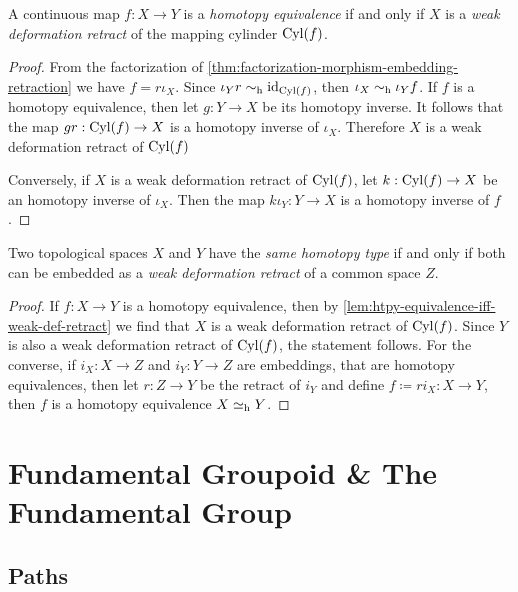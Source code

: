\begin{lemma}
    \label{lem:htpy-equivalence-iff-weak-def-retract}
    A continuous map \(f: X \to Y\) is a \emph{homotopy equivalence} if and only if
    \(X\) is a \emph{weak deformation retract} of the mapping cylinder \(\operatorname{Cyl}(f)\).
\end{lemma}

\begin{proof}
    From the factorization of \cref{thm:factorization-morphism-embedding-retraction}
    we have \(f = r \iota_X\). Since \(\iota_Y r \sim_{\text{h}} \operatorname{id}_{\operatorname{Cyl}(f)}\), then
    \(\iota_X \sim_{\text{h}} \iota_Y f\). If \(f\) is a homotopy equivalence, then let
    \(g: Y \to X\) be its homotopy inverse. It follows that the map
    \(g r: \operatorname{Cyl}(f) \to X\) is a homotopy inverse of \(\iota_X\). Therefore \(X\) is
    a weak deformation retract of \(\operatorname{Cyl}(f)\)

    Conversely, if \(X\) is a weak deformation retract of \(\operatorname{Cyl}(f)\), let
    \(k: \operatorname{Cyl}(f) \to X\) be an homotopy inverse of \(\iota_X\). Then the map \(k
    \iota_Y: Y \to X\) is a homotopy inverse of \(f\).
\end{proof}

\begin{theorem}
    \label{thm:same-htpy-type-iff-emb-weak-deformation-retract}
    Two topological spaces \(X\) and \(Y\) have the \emph{same homotopy type} if and
    only if both can be embedded as a \emph{weak deformation retract} of a common
    space \(Z\).
\end{theorem}

\begin{proof}
    If \(f: X \to Y\) is a homotopy equivalence, then by
    \cref{lem:htpy-equivalence-iff-weak-def-retract} we find that \(X\) is a weak
    deformation retract of \(\operatorname{Cyl}(f)\). Since \(Y\) is also a weak deformation
    retract of \(\operatorname{Cyl}(f)\), the statement follows. For the converse, if \(i_X: X \to
    Z\) and \(i_Y: Y \to Z\) are embeddings, that are homotopy equivalences, then
    let \(r: Z \to Y\) be the retract of \(i_Y\) and define \(f \coloneq r i_X: X
    \to Y\), then \(f\) is a homotopy equivalence \(X \simeq_{\text{h}} Y\).
\end{proof}

\section{Fundamental Groupoid \& The Fundamental Group}

\subsection{Paths}

